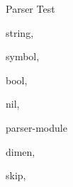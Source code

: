 \documentclass{article}
\begin{document}
\begin{qstest}{Parser Test}{\@lispread}
\begin{qstest}{string}{\@lispread,\@tlabel@string}
        {}
    \end{qstest}
    \begin{qstest}{symbol}{\@lispread,\@tlabel@symbol}
      \parserTest{\symbol}{\@tlabel@symbol{\symbol}}
    \end{qstest}
    \begin{qstest}{bool}{\@lispread,\@tlabel@bool}
    \end{qstest}
    \begin{qstest}{nil}{\@lispread,\@tlabel@nil}
      \parserTest{()}{\@tlabel@nil{}}
    \end{qstest}
    \begin{qstest}{parser-module}{\@lispread}
      \def\@mod@read@dummy#1#2{\gdef#1{\@tlabel@testdummy{#2}}}
    \end{qstest}
    \begin{qstest}{dimen}{\@lispread,\@tlabel@dimen}
      \parserTest{!123.45pt}{\@tlabel@dimen{123.45pt}}
    \end{qstest}
    \begin{qstest}{skip}{\@lispread,\@tlabel@skip}
        {}
    \end{qstest}
  \end{qstest}
\end{document}
